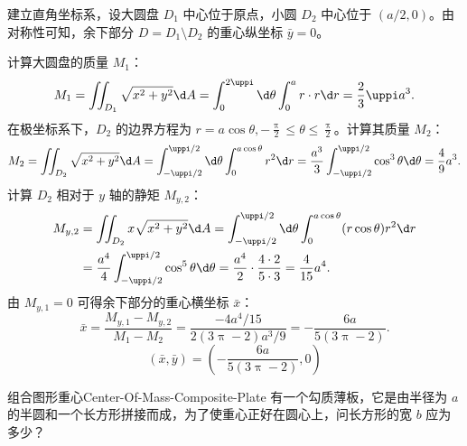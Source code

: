 \begin{solution}
    建立直角坐标系，设大圆盘 $D_1$ 中心位于原点，小圆 $D_2$ 中心位于 $(a/2, 0)$。由对称性可知，余下部分 $D = D_1 \setminus D_2$ 的重心纵坐标 $\bar{y} = 0$。

    计算大圆盘的质量 $M_1$：
    \begin{equation}\label{eq:mass-total}
        M_1 = \iint_{D_1} \sqrt{x^2+y^2} \d A = \int_0^{2\uppi} \d \theta \int_0^a r \cdot r \d r = \frac{2}{3} \uppi a^3.
    \end{equation}
    在极坐标系下，$D_2$ 的边界方程为 $r = a \cos \theta, -\frac{\uppi}{2} \le \theta \le \frac{\uppi}{2}$。计算其质量 $M_2$：
    \begin{equation}\label{eq:mass-sub}
        M_2 = \iint_{D_2} \sqrt{x^2+y^2} \d A = \int_{-\uppi/2}^{\uppi/2} \d \theta \int_0^{a \cos \theta} r^2 \d r = \frac{a^3}{3} \int_{-\uppi/2}^{\uppi/2} \cos^3 \theta \d \theta = \frac{4}{9} a^3.
    \end{equation}
    计算 $D_2$ 相对于 $y$ 轴的静矩 $M_{y,2}$：
    \begin{equation}\label{eq:stat-moment}
        \begin{aligned}
            M_{y,2} & = \iint_{D_2} x \sqrt{x^2+y^2} \d A = \int_{-\uppi/2}^{\uppi/2} \d \theta \int_0^{a \cos \theta} (r \cos \theta) r^2 \d r               \\
                    & = \frac{a^4}{4} \int_{-\uppi/2}^{\uppi/2} \cos^5 \theta \d \theta = \frac{a^4}{2} \cdot \frac{4 \cdot 2}{5 \cdot 3} = \frac{4}{15} a^4.
        \end{aligned}
    \end{equation}
    由 $M_{y,1} = 0$ 可得余下部分的重心横坐标 $\bar{x}$：
    \begin{equation}\label{eq:coord-calc}
        \bar{x} = \frac{M_{y,1} - M_{y,2}}{M_1 - M_2} = \frac{-4a^4/15}{2(3\uppi - 2)a^3/9} = - \frac{6a}{5(3\uppi - 2)}.
    \end{equation}
    \begin{equation}
        \boxed{(\bar{x}, \bar{y}) = \left( -\frac{6a}{5(3\uppi - 2)}, 0 \right)}
    \end{equation}
\end{solution}

\begin{problem}{组合图形重心}{Center-Of-Mass-Composite-Plate}
    有一个勾质薄板，它是由半径为 $a$ 的半圆和一个长方形拼接而成，为了使重心正好在圆心上，问长方形的宽 $b$ 应为多少？
\end{problem}

